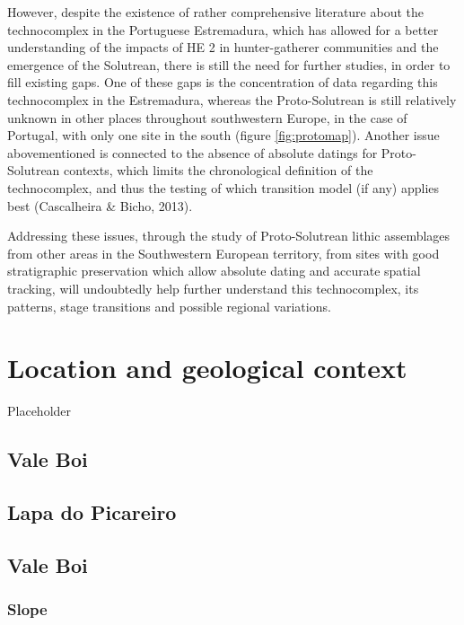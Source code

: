 \documentclass[12pt,twoside]{reedthesis}
\begin{document}
However, despite the existence of rather comprehensive literature about the technocomplex in the Portuguese Estremadura, which has allowed for a better understanding of the impacts of HE 2 in hunter-gatherer communities and the emergence of the Solutrean, there is still the need for further studies, in order to fill existing gaps. One of these gaps is the concentration of data regarding this technocomplex in the Estremadura, whereas the Proto-Solutrean is still relatively unknown in other places throughout southwestern Europe, in the case of Portugal, with only one site in the south (figure \ref{fig:protomap}). Another issue abovementioned is connected to the absence of absolute datings for Proto-Solutrean contexts, which limits the chronological definition of the technocomplex, and thus the testing of which transition model (if any) applies best (Cascalheira \& Bicho, 2013).

Addressing these issues, through the study of Proto-Solutrean lithic assemblages from other areas in the Southwestern European territory, from sites with good stratigraphic preservation which allow absolute dating and accurate spatial tracking, will undoubtedly help further understand this technocomplex, its patterns, stage transitions and possible regional variations.

\hypertarget{location-and-geological-context}{%
\chapter{Location and geological context}\label{location-and-geological-context}}

Placeholder

\hypertarget{vale-boi}{%
\section{Vale Boi}\label{vale-boi}}

\hypertarget{lapa-do-picareiro}{%
\section{Lapa do Picareiro}\label{lapa-do-picareiro}}

\hypertarget{vale-boi-1}{%
\section{Vale Boi}\label{vale-boi-1}}

\hypertarget{slope}{%
\subsection{Slope}\label{slope}}
\end{document}
